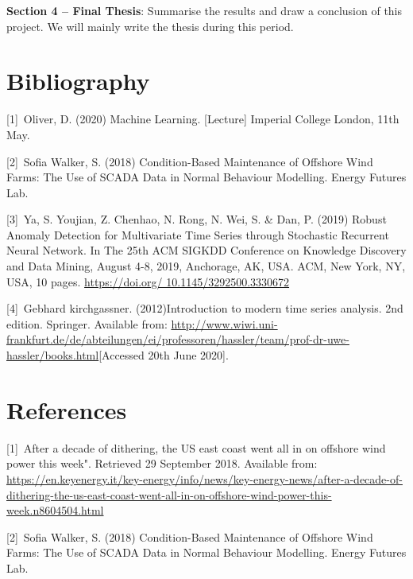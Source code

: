 \documentclass[english,a4paper,11pt]{article}
\begin{document}
\textbf{Section 4 – Final Thesis}: Summarise the results and draw a conclusion of this project. We will mainly write the thesis during this period.

\section{Bibliography}
[1]\ Oliver, D. (2020) Machine Learning. [Lecture] Imperial College London, 11th May.

[2]\ Sofia Walker, S. (2018) Condition-Based Maintenance of Offshore Wind Farms: The Use of SCADA Data in Normal Behaviour Modelling. Energy Futures Lab. 

[3]\ Ya, S. Youjian, Z. Chenhao, N. Rong, N. Wei, S. \& Dan, P. (2019) Robust Anomaly Detection for Multivariate Time Series through Stochastic Recurrent Neural Network. In The 25th ACM SIGKDD Conference on Knowledge Discovery and Data Mining, August 4-8, 2019, Anchorage, AK, USA. ACM, New York, NY, USA, 10 pages. \url{https://doi.org/ 10.1145/3292500.3330672}

[4]\ Gebhard kirchgassner. (2012)Introduction to modern time series analysis. 2nd edition. Springer. Available from: \url{http://www.wiwi.uni-frankfurt.de/de/abteilungen/ei/professoren/hassler/team/prof-dr-uwe-hassler/books.html}[Accessed 20th June 2020].

\section{References}
[1]\ After a decade of dithering, the US east coast went all in on offshore wind power this week". Retrieved 29 September 2018. Available from: \url{https://en.keyenergy.it/key-energy/info/news/key-energy-news/after-a-decade-of-dithering-the-us-east-coast-went-all-in-on-offshore-wind-power-this-week.n8604504.html}

[2]\ Sofia Walker, S. (2018) Condition-Based Maintenance of Offshore Wind Farms: The Use of SCADA Data in Normal Behaviour Modelling. Energy Futures Lab. 
\end{document}
